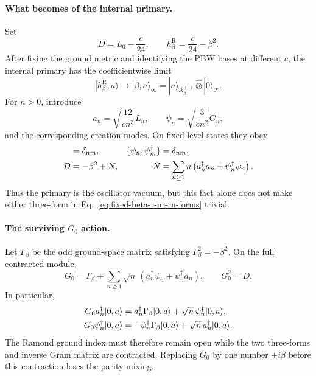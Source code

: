 \documentclass[11pt]{article}
\newcommand{\R}{\mathrm{R}}
\begin{document}
\paragraph{What becomes of the internal primary.}
Set
\begin{equation}
 D=L_0-\frac c{24},
 \qquad
 h_\beta^{\R}=\frac c{24}-\beta^2.
\end{equation}
After fixing the ground metric and identifying the PBW bases at different
\(c\), the internal primary has the coefficientwise limit
\begin{equation}
 |h_\beta^{\R},a\rangle
 \longrightarrow
 |\beta,a\rangle_\infty
 =
 |a\rangle_{\mathcal R_\beta^{(0)}}
 \widehat\otimes |0\rangle_{\mathcal F}.
 \label{eq:fixed-beta-r-primary-limit}
\end{equation}
For \(n>0\), introduce
\begin{equation}
 a_n=\sqrt{\frac{12}{cn^3}}L_n,
 \qquad
 \psi_n=\sqrt{\frac{3}{cn^2}}G_n,
 \label{eq:fixed-beta-r-normalized-modes}
\end{equation}
and the corresponding creation modes.  On fixed-level states they obey
\begin{align}
 [a_n,a_m^\dagger]&=\delta_{nm},
 &
 \{\psi_n,\psi_m^\dagger\}&=\delta_{nm},
 \notag\\
 D&=-\beta^2+N,
 &
 N&=\sum_{n\geq1}n
 \left(a_n^\dagger a_n+\psi_n^\dagger\psi_n\right).
 \label{eq:fixed-beta-r-free-algebra}
\end{align}
Thus the primary is the oscillator vacuum, but this fact alone does not
make either three-form in Eq.~\eqref{eq:fixed-beta-r-nr-rn-forms} trivial.

\paragraph{The surviving \(G_0\) action.}
Let \(\Gamma_\beta\) be the odd ground-space matrix satisfying
\(\Gamma_\beta^2=-\beta^2\).  On the full contracted module,
\begin{equation}
 G_0
 =
 \Gamma_\beta+
 \sum_{n\geq1}\sqrt n\,
 \left(a_n^\dagger\psi_n+\psi_n^\dagger a_n\right),
 \qquad
 G_0^2=D.
 \label{eq:fixed-beta-r-g0-contracted}
\end{equation}
In particular,
\begin{align}
 G_0a_n^\dagger|0,a\rangle
 &=
 a_n^\dagger\Gamma_\beta|0,a\rangle
 +\sqrt n\,\psi_n^\dagger|0,a\rangle,
 \notag\\
 G_0\psi_n^\dagger|0,a\rangle
 &=
 -\psi_n^\dagger\Gamma_\beta|0,a\rangle
 +\sqrt n\,a_n^\dagger|0,a\rangle.
 \label{eq:fixed-beta-r-g0-one-particle}
\end{align}
The Ramond ground index must therefore remain open while the two
three-forms and inverse Gram matrix are contracted.  Replacing \(G_0\) by
one number \(\pm i\beta\) before this contraction loses the parity mixing.
\end{document}
